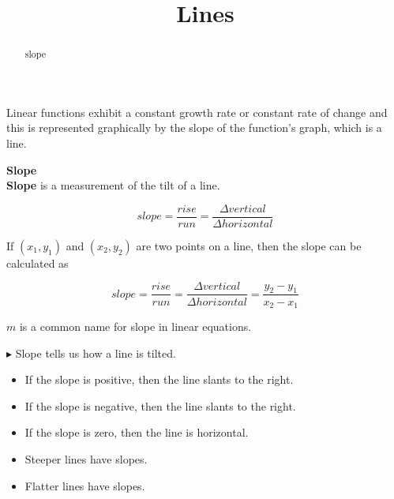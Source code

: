 \documentclass{ximera}
\title{Lines}
\begin{document}
\begin{abstract}
slope
\end{abstract}
\maketitle



Linear functions exhibit a constant growth rate or constant rate of change and this is represented graphically by the slope of the function's graph, which is a line.


\begin{definition} \textbf{\textcolor{green!50!black}{Slope}} \\


\textbf{Slope} is a measurement of the tilt of a line.


\[
slope = \frac{rise}{run} = \frac{\Delta vertical}{\Delta horizontal}
\]


If $(x_1, y_1)$ and $(x_2, y_2)$ are two points on a line, then the slope can be calculated as

\[
slope = \frac{rise}{run} = \frac{\Delta vertical}{\Delta horizontal} = \frac{y_2 - y_1}{x_2 - x_1}
\]



\end{definition}


$m$ is a common name for slope in linear equations.




\begin{observation}

$\blacktriangleright$ Slope tells us how a line is tilted.


\begin{itemize}
\item If the slope is positive, then the line slants   to the right.
\item If the slope is negative, then the line slants   to the right.
\item If the slope is zero, then the line is horizontal.
\end{itemize}


\begin{itemize}
\item Steeper lines have  slopes.
\item Flatter lines have  slopes.
\end{itemize}

\end{observation}
\end{document}
